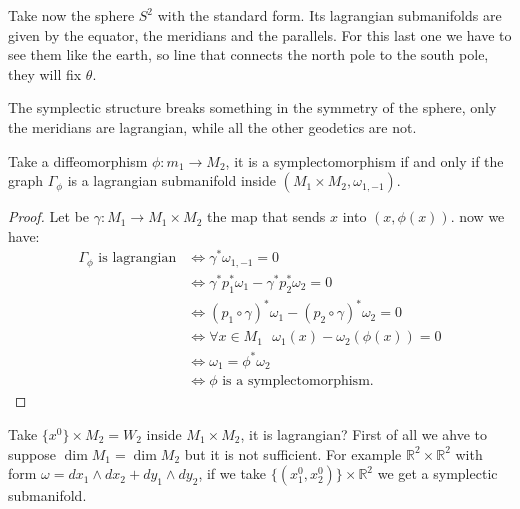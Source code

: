 \documentclass[misc]{subfiles}
\begin{document}
\begin{Exp}
    Take now the sphere $S^2$ with the standard form. Its lagrangian submanifolds are given by the equator, the meridians and the parallels. For this last one we have to see them like the earth, so line that connects the north pole to the south pole, they will fix $\theta$.

    The symplectic structure breaks something in the symmetry of the sphere, only the meridians are lagrangian, while all the other geodetics are not.
\end{Exp}

\begin{Prp}
    Take a diffeomorphism $\phi: m_1 \rightarrow M_2$, it is a symplectomorphism if and only if the graph $\Gamma_\phi$ is a lagrangian submanifold inside $(M_1 \times M_2, \omega_{1,-1})$.

    \begin{proof}
        Let be $\gamma: M_1 \rightarrow M_1 \times M_2$ the map that sends $x$ into $(x,\phi(x))$. now we have:
        \begin{align*}
        \Gamma_\phi \text{ is lagrangian}   &\iff \gamma^\ast\omega_{1,-1}=0 \\
                                            &\iff \gamma^\ast p_1^\ast \omega_1-\gamma^\ast p_2^\ast \omega_2=0 \\
                                            &\iff (p_1 \circ \gamma)^\ast \omega_1-(p_2 \circ \gamma)^\ast \omega_2=0 \\
                                            &\iff \forall x \in M_1 \text{   } \omega_1(x)-\omega_2(\phi(x))=0 \\
                                            &\iff \omega_1 = \phi^\ast \omega_2 \\
                                            &\iff \phi \text{ is a symplectomorphism}.
        \end{align*}
    \end{proof}
\end{Prp}

\begin{Exp}
    Take $\{x^0\} \times M_2 = W_2$ inside $M_1 \times M_2$, it is lagrangian? First of all we ahve to suppose $\dim M_1 = \dim M_2$ but it is not sufficient. For example $\mathbb{R}^2 \times \mathbb{R}^2$ with form $\omega=dx_1 \wedge dx_2 + dy_1 \wedge dy_2$, if we take $\{(x^0_1,x^0_2)\} \times \mathbb{R}^2$ we get a symplectic submanifold.
\end{Exp}
\end{document}
